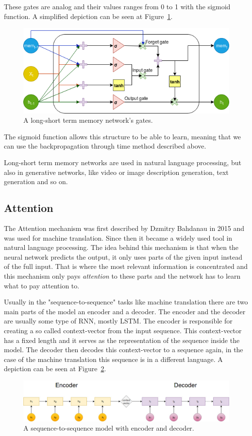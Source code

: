 These gates are analog and their values ranges from 0 to 1 with the sigmoid function. A simplified depiction can be seen at Figure~\ref{fig:lstm}.
\begin{figure}[!ht]
	\centering
	\includegraphics[width=125mm, keepaspectratio]{figures/lstm.png}
	\caption{A long-short term memory network's gates.}
	\label{fig:lstm}
\end{figure}

The sigmoid function allows this structure to be able to learn, meaning that we can use the backpropagation through time method described above.

Long-short term memory networks are used in natural language processing, but also in generative networks, like video or image description generation, text generation and so on.

\subsection{Attention}
The Attention mechanism was first described by Dzmitry Bahdanau in 2015 \cite{Bahdanau:2015} and was used for machine translation. Since then it became a widely used tool in natural language processing. The idea behind this mechanism is that when the neural network predicts the output, it only uses parts of the given input instead of the full input. That is where the most relevant information is concentrated and this mechanism only pays \textit{attention} to these parts and the network has to learn what to pay attention to.

Usually in the "sequence-to-sequence" tasks like machine translation there are two main parts of the model an encoder and a decoder. The encoder and the decoder are usually some type of RNN, mostly LSTM. The encoder is responsible for creating a so called context-vector from the input sequence. This context-vector has a fixed length and it serves as the representation of the sequence inside the model. The decoder then decodes this context-vector to a sequence again, in the case of the machine translation this sequence is in a different language. A depiction can be seen at Figure~\ref{fig:seq_to_seq}.
\begin{figure}[!ht]
	\centering
	\includegraphics[width=150mm, keepaspectratio]{figures/seq_to_seq.jpg}
	\caption{A sequence-to-sequence model with encoder and decoder.}
	\label{fig:seq_to_seq}
\end{figure}

